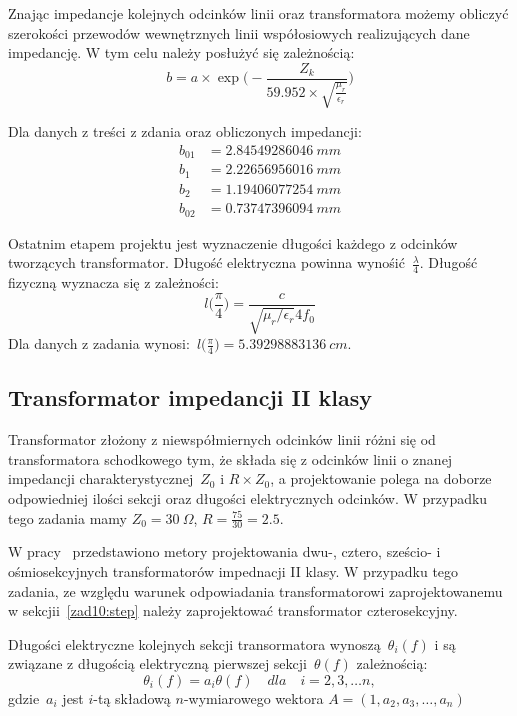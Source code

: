\documentclass[rep.tex]{subfiles}
\begin{document}
Znając impedancje kolejnych odcinków linii oraz transformatora możemy obliczyć szerokości przewodów wewnętrznych linii współosiowych realizujących dane impedancję.
W tym celu należy posłużyć się zależnością:
\begin{equation}
  b = a \times \exp\Bigg(- \frac{Z_k}{59.952\times\sqrt{\frac{\mu_r}{\epsilon_r}}}\Bigg)
\end{equation}

Dla danych z treści z zdania oraz obliczonych impedancji:
\begin{align}
  b_{01} &= 2.84549286046~mm  \nonumber \\
  b_{1~} &= 2.22656956016~mm  \nonumber \\
  b_{2~} &= 1.19406077254~mm  \nonumber \\
  b_{02} &= 0.73747396094~mm  \nonumber
\end{align}

Ostatnim etapem projektu jest wyznaczenie długości każdego z odcinków tworzących transformator.
Długość elektryczna powinna wynośić~$\frac{\lambda}{4}$.
Długość fizyczną wyznacza się z zależności:
\begin{equation}
  l\Big(\frac{\pi}{4}\Big) = \frac{c}{\sqrt{\mu_r/\epsilon_r}4f_0}
\end{equation}
Dla danych z zadania wynosi:~$l\Big(\frac{\pi}{4}\Big) = 5.39298883136~cm$.

\subsection{Transformator impedancji II klasy}
Transformator złożony z niewspółmiernych odcinków linii różni się od transformatora schodkowego tym,
że składa się z odcinków linii o znanej impedancji charakterystycznej~$Z_0$ i $R\times Z_0$,
a projektowanie polega na doborze odpowiedniej ilości sekcji oraz długości elektrycznych odcinków.
W przypadku tego zadania mamy $Z_0 = 30~\Omega$, $R = \frac{75}{30} = 2.5$.

W pracy~\cite{obwody} przedstawiono metory projektowania dwu-, cztero, sześcio- i ośmiosekcyjnych transformatorów impednacji II klasy.
W przypadku tego zadania, ze względu warunek odpowiadania transformatorowi zaprojektowanemu w sekcjii~\ref{zad10:step} należy zaprojektować transformator czterosekcyjny.

Długości elektryczne kolejnych sekcji transormatora wynoszą~$\theta_i(f)$ i są związane z długością elektryczną pierwszej sekcji~$\theta(f)$ zależnością:
\begin{equation}
  \theta_i(f) = a_i\theta(f) \quad dla \quad i = 2, 3, \ldots n,
\end{equation}
gdzie~$a_i$ jest $i$-tą składową $n$-wymiarowego wektora $A = (1, a_2, a_3, \ldots, a_n)$
\end{document}
